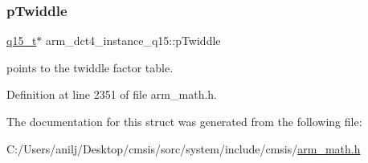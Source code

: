 \subsubsection{\texorpdfstring{p\+Twiddle}{pTwiddle}}
{\footnotesize\ttfamily \hyperlink{arm__math_8h_ab5a8fb21a5b3b983d5f54f31614052ea}{q15\+\_\+t}$\ast$ arm\+\_\+dct4\+\_\+instance\+\_\+q15\+::p\+Twiddle}

points to the twiddle factor table. 

Definition at line 2351 of file arm\+\_\+math.\+h.



The documentation for this struct was generated from the following file\+:\begin{DoxyCompactItemize}
\item 
C\+:/\+Users/anilj/\+Desktop/cmsis/sorc/system/include/cmsis/\hyperlink{arm__math_8h}{arm\+\_\+math.\+h}\end{DoxyCompactItemize}
